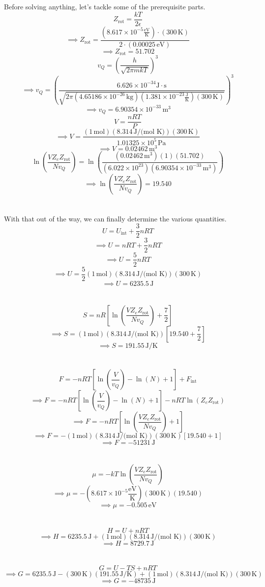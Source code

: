 \documentclass[12pt]{article}
\newcommand{\avogadro}{6.022\times10^{23}}
\newcommand{\boltzmannConstK}{1.381\times10^{-23}\frac{\text{J}}{\text{K}}}
\newcommand{\boltzmannConstInEV}{8.617\times10^{-5}\frac{\text{eV}}{\text{K}}}
\newcommand{\planckConst}{6.626\times10^{-34}\text{J}\cdot\text{s}}
\newcommand{\atmP}{1.01325\times10^5\,\text{Pa}}
\begin{document}
\begin{flushleft}
Before solving anything, let's tackle some of the prerequisite parts.
$$Z_\text{rot}=\frac{kT}{2\epsilon}$$
$$\implies Z_\text{rot}=\frac{(\boltzmannConstInEV)\cdot(300\,\text{K})}{2\cdot(0.00025\,\text{eV})}$$
$$\implies Z_\text{rot}=51.702$$
$$v_Q=\left(\frac{h}{\sqrt{2\pi mkT}}\right)^3$$
$$\implies v_Q=\left(\frac{\planckConst}{\sqrt{2\pi(4.65186\times10^{-26}\,\text{kg})(\boltzmannConstK)(300\,\text{K})}}\right)^3$$
$$\implies v_Q=6.90354\times10^{-33}\,\text{m}^3$$
$$V=\frac{nRT}{P}$$
$$\implies V=\frac{(1\,\text{mol})(8.314\,\text{J/(mol K)})(300\,\text{K})}{\atmP}$$
$$\implies V=0.02462\,\text{m}^3$$
$$\ln\left(\frac{VZ_eZ_\text{rot}}{Nv_Q}\right)=\ln\left(\frac{(0.02462\,\text{m}^3)(1)(51.702)}{(\avogadro)(6.90354\times10^{-33}\,\text{m}^3)}\right)$$
$$\implies\ln\left(\frac{VZ_eZ_\text{rot}}{Nv_Q}\right)=19.540$$\\~\\

With that out of the way, we can finally determine the various quantities.
$$U=U_\text{int}+\frac{3}{2}nRT$$
$$\implies U=nRT+\frac{3}{2}nRT$$
$$\implies U=\frac{5}{2}nRT$$
$$\implies U=\frac{5}{2}(1\,\text{mol})(8.314\,\text{J/(mol K)})(300\,\text{K})$$
$$\implies U=6235.5\,\text{J}$$\\~\\

$$S=nR\left[\ln\left(\frac{VZ_eZ_\text{rot}}{Nv_Q}\right)+\frac{7}{2}\right]$$
$$\implies S=(1\,\text{mol})(8.314\,\text{J/(mol K)})\left[19.540+\frac{7}{2}\right]$$
$$\implies S=191.55\,\text{J/K}$$\\~\\

$$F=-nRT[\ln(\frac{V}{v_Q})-\ln(N)+1]+F_\text{int}$$
$$\implies F=-nRT[\ln(\frac{V}{v_Q})-\ln(N)+1]-nRT\ln(Z_eZ_\text{rot})$$
$$\implies F=-nRT[\ln\left(\frac{VZ_eZ_\text{rot}}{Nv_Q}\right)+1]$$
$$\implies F=-(1\,\text{mol})(8.314\,\text{J/(mol K)})(300\,\text{K})[19.540+1]$$
$$\implies F=-51231\,\text{J}$$\\~\\

$$\mu=-kT\ln\left(\frac{VZ_eZ_\text{rot}}{Nv_Q}\right)$$
$$\implies\mu=-(\boltzmannConstInEV)(300\,\text{K})(19.540)$$
$$\implies\mu=-0.505\,\text{eV}$$\\~\\

$$H=U+nRT$$
$$\implies H=6235.5\,\text{J}+(1\,\text{mol})(8.314\,\text{J/(mol K)})(300\,\text{K})$$
$$\implies H=8729.7\,\text{J}$$\\~\\

$$G=U-TS+nRT$$
$$\implies G=6235.5\,\text{J}-(300\,\text{K})(191.55\,\text{J/K})+(1\,\text{mol})(8.314\,\text{J/(mol K)})(300\,\text{K})$$
$$\implies G=-48735\,\text{J}$$



\end{flushleft}
\end{document}
